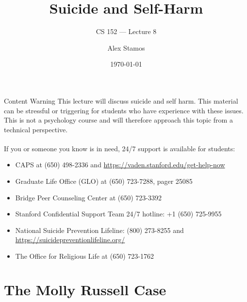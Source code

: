 \documentclass[nobackground,dvipsnames,table,aspectratio=169]{beamer}
\title{Suicide and Self-Harm}
\subtitle{CS 152 --- Lecture 8}
\author[A. Stamos]{Alex Stamos}
\institute[Stanford University]{Stanford Cyber Policy Center}
\date[2022]{\today}
\begin{document}
\begin{frame}
    \titlepage
\end{frame}

\begin{frame}{Content Warning}%
    This lecture will discuss suicide and self harm. This material can be stressful or triggering for students who have experience with these issues. This is not a psychology course and will therefore approach this topic from a technical perspective.\\~\\
    If you or someone you know is in need, 24/7 support is available for students:
    \small
    \begin{itemize}
        \item CAPS at (650) 498-2336 and \url{https://vaden.stanford.edu/get-help-now}
        \item Graduate Life Office (GLO) at (650) 723-7288, pager 25085
        \item Bridge Peer Counseling Center at (650) 723-3392
        \item Stanford Confidential Support Team 24/7 hotline: +1 (650) 725-9955
        \item National Suicide Prevention Lifeline: (800) 273-8255 and \url{https://suicidepreventionlifeline.org/}
        \item The Office for Religious Life at (650) 723-1762
    \end{itemize}
\end{frame}

\section{The Molly Russell Case}
\end{document}
